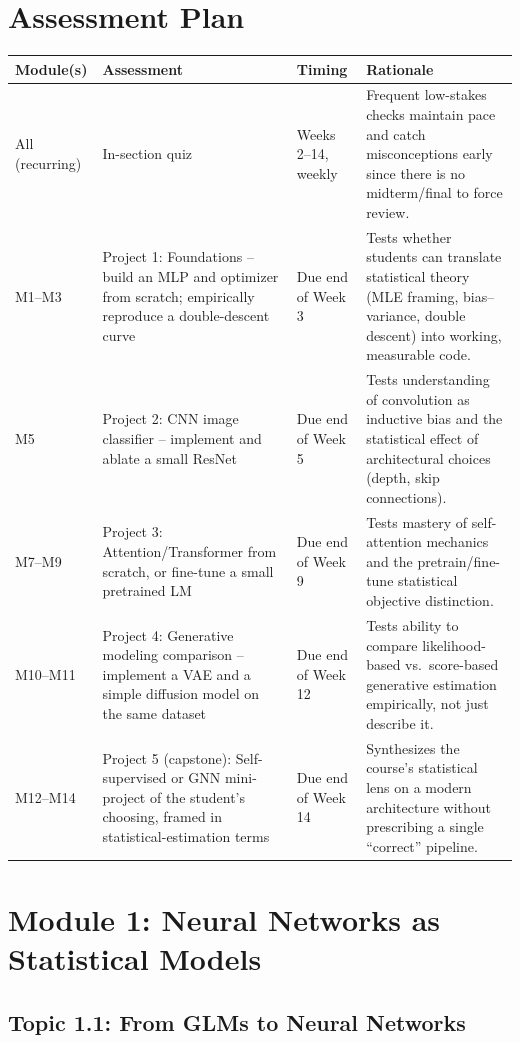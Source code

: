 \documentclass[11pt]{article}
\begin{document}
\section{Assessment Plan}
\begin{longtable}{@{}p{3.6cm}p{3.4cm}p{2.6cm}p{5.6cm}@{}}
\toprule
\textbf{Module(s)} & \textbf{Assessment} & \textbf{Timing} & \textbf{Rationale} \\
\midrule
\endhead
All (recurring) & In-section quiz & Weeks 2--14, weekly & Frequent low-stakes checks maintain pace and catch misconceptions early since there is no midterm/final to force review. \\
M1--M3 & Project 1: Foundations -- build an MLP and optimizer from scratch; empirically reproduce a double-descent curve & Due end of Week 3 & Tests whether students can translate statistical theory (MLE framing, bias--variance, double descent) into working, measurable code. \\
M5 & Project 2: CNN image classifier -- implement and ablate a small ResNet & Due end of Week 5 & Tests understanding of convolution as inductive bias and the statistical effect of architectural choices (depth, skip connections). \\
M7--M9 & Project 3: Attention/Transformer from scratch, or fine-tune a small pretrained LM & Due end of Week 9 & Tests mastery of self-attention mechanics and the pretrain/fine-tune statistical objective distinction. \\
M10--M11 & Project 4: Generative modeling comparison -- implement a VAE and a simple diffusion model on the same dataset & Due end of Week 12 & Tests ability to compare likelihood-based vs.\ score-based generative estimation empirically, not just describe it. \\
M12--M14 & Project 5 (capstone): Self-supervised or GNN mini-project of the student's choosing, framed in statistical-estimation terms & Due end of Week 14 & Synthesizes the course's statistical lens on a modern architecture without prescribing a single ``correct'' pipeline. \\
\bottomrule
\end{longtable}

\clearpage
\section{Module 1: Neural Networks as Statistical Models}

\subsection{Topic 1.1: From GLMs to Neural Networks}
\end{document}
